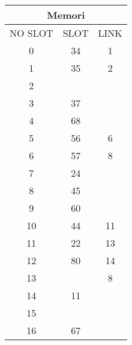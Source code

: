 \documentclass[12pt,a4paper]{article}
\begin{document}
\begin{enumerate}
\begin{multicols}{2}
      \begin{center}
        \begin{adjustbox}{scale=1,center}
          \begin{tabular}{ |c|c|c| } 
            \hline \multicolumn{3}{|c|}{Memori} \\ \hline \hline 
            NO SLOT & SLOT & LINK \\ \hline \hline
            0       & 34   &  1   \\ \hline
            1       & 35   &  2   \\ \hline
            2       &      &      \\ \hline
            3       & 37   &      \\ \hline
            4       & 68   &      \\ \hline
            5       & 56   &  6   \\ \hline
            6       & 57   &  8   \\ \hline
            7       & 24   &      \\ \hline
            8       & 45   &      \\ \hline
            9       & 60   &      \\ \hline
            10      & 44   &  11  \\ \hline
            11      & 22   &  13  \\ \hline
            12      & 80   &  14  \\ \hline
            13      &      &   8  \\ \hline
            14      & 11   &      \\ \hline
            15      &      &      \\ \hline
            16      & 67   &      \\ \hline
          \end{tabular}
        \end{adjustbox}
      \end{center}


\end{multicols}
\end{enumerate}
\end{document}
